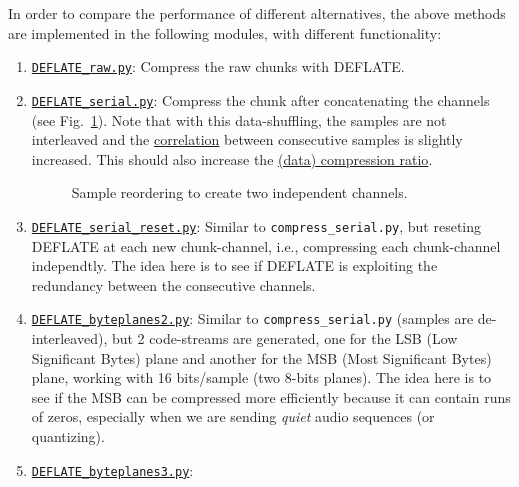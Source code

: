 In order to compare the performance of different alternatives, the
above methods are implemented in the following modules, with different
functionality:

\begin{enumerate}
\item
  \href{https://github.com/Tecnologias-multimedia/InterCom/blob/master/src/DEFLATE\_raw.py}{\texttt{DEFLATE\_raw.py}}:
  Compress the raw chunks with DEFLATE.
\item
  \href{https://github.com/Tecnologias-multimedia/InterCom/blob/master/src/DEFLATE\_serial.py}{\texttt{DEFLATE\_serial.py}}:
  Compress the chunk after concatenating the channels (see
  Fig.~\ref{fig:reordering}). Note that with this data-shuffling,
  the samples are not interleaved and the
  \href{https://en.wikipedia.org/wiki/Correlation}{correlation}
  between consecutive samples is slightly increased. This should also
  increase the
  \href{https://en.wikipedia.org/wiki/Data_compression_ratio}{(data)
    compression ratio}.
\begin{figure}
  \begin{center}
  \end{center}
  \caption{Sample reordering to create two independent channels.}
  \label{fig:reordering}
\end{figure}
\item
  \href{https://github.com/Tecnologias-multimedia/InterCom/blob/master/src/DEFLATE\_serial\_reset.py}{\texttt{DEFLATE\_serial\_reset.py}}:
  Similar to \verb|compress_serial.py|, but reseting DEFLATE at each
  new chunk-channel, i.e., compressing each chunk-channel
  independtly. The idea here is to see if DEFLATE is exploiting the
  redundancy between the consecutive channels.
\item
  \href{https://github.com/Tecnologias-multimedia/InterCom/blob/master/src/DEFLATE\_byteplanes2.py}{\texttt{DEFLATE\_byteplanes2.py}}:
  Similar to \verb|compress_serial.py| (samples are de-interleaved),
  but 2 code-streams are generated, one for the LSB (Low Significant
  Bytes) plane and another for the MSB (Most Significant Bytes) plane,
  working with 16 bits/sample (two 8-bits planes). The idea here is to see if the MSB can
  be compressed more efficiently because it can contain runs of zeros,
  especially when we are sending \emph{quiet} audio sequences (or quantizing).
\item
  \href{https://github.com/Tecnologias-multimedia/InterCom/blob/master/src/DEFLATE\_byteplanes3.py}{\texttt{DEFLATE\_byteplanes3.py}}:

\end{enumerate}
